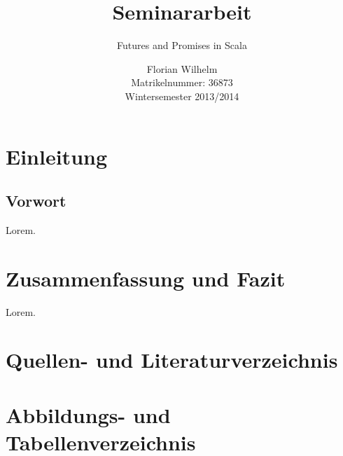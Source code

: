 \documentclass[11pt,a4paper,titlepage,ngerman]{scrartcl}
\begin{document}
\lstset{breaklines=true}

\titlehead{
	\texttt{[image: pic/500px-Hska\_logo.png]}
}
\title{Seminararbeit}
\subtitle{Futures and Promises in Scala}
\author{Florian Wilhelm \\
		Matrikelnummer: 36873\\
		Wintersemester 2013/2014}
\publishers{
    \textbf{Betreuer:} Prof. Dr. Martin Sulzmann
}
\maketitle

\tableofcontents
\newpage

\section{Einleitung}


\subsection{Vorwort}

Lorem.

\newpage
\section{Zusammenfassung und Fazit}

Lorem. \cite{scalalang}

\newpage

\section{Quellen- und Literaturverzeichnis}




\section{Abbildungs- und Tabellenverzeichnis}

\renewcommand{\listfigurename}{Verzeichnis der Abbildungen}
\listoffigures

\newpage

\printglossary
\end{document}
